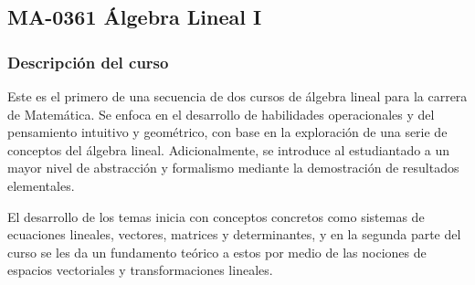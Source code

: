 \newpage
\subsection*{MA-0361 Álgebra Lineal I}

\hypertarget{MA0361}{}
\begin{refsection}
\begin{table}[H]
\end{table}



\subsubsection*{Descripción del curso}

Este es el primero de una secuencia de dos cursos de álgebra lineal para la carrera de Matemática. Se enfoca en el desarrollo de habilidades operacionales y del pensamiento intuitivo y geométrico, con base en la exploración de una serie de conceptos del álgebra lineal. Adicionalmente, se introduce al estudiantado a un mayor nivel de abstracción y formalismo mediante la demostración de resultados elementales. 

El desarrollo de los temas inicia con conceptos concretos como sistemas de ecuaciones lineales, vectores, matrices y determinantes, y en la segunda parte del curso se les da un fundamento teórico a estos por medio de las nociones de espacios vectoriales y transformaciones lineales.


\end{refsection}
